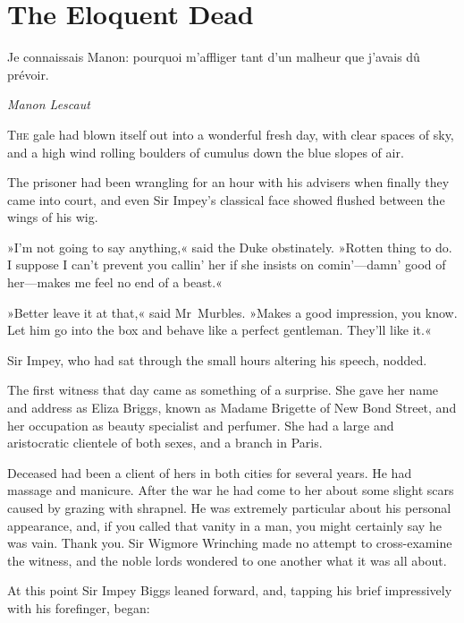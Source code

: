 

\chapter{The Eloquent Dead}

\epigraph{\begin{french}Je connaissais Manon: pourquoi m'affliger tant d'un malheur que j'avais dû prévoir.\end{french}}{\textit{Manon Lescaut}}




\lettrine[lines=4]{T}{he} gale had blown itself out into a wonderful fresh day, with clear
spaces of sky, and a high wind rolling boulders of cumulus down the
blue slopes of air.

\zz
The prisoner had been wrangling for an hour with his advisers when
finally they came into court, and even Sir Impey's classical face
showed flushed between the wings of his wig.

»I'm not going to say anything,« said the Duke obstinately. »Rotten
thing to do. I suppose I can't prevent you callin' her if she insists
on comin'—damn' good of her—makes me feel no end of a beast.«

»Better leave it at that,« said Mr~Murbles. »Makes a good impression,
you know. Let him go into the box and behave like a perfect gentleman.
They'll like it.«

Sir Impey, who had sat through the small hours altering his speech,
nodded.

The first witness that day came as something of a surprise. She gave
her name and address as Eliza Briggs, known as Madame Brigette of New
Bond Street, and her occupation as beauty specialist and perfumer. She
had a large and aristocratic clientele of both sexes, and a branch in
Paris.

Deceased had been a client of hers in both cities for several years.
He had massage and manicure. After the war he had come to her about
some slight scars caused by grazing with shrapnel. He was extremely
particular about his personal appearance, and, if you called that
vanity in a man, you might certainly say he was vain. Thank you. Sir
Wigmore Wrinching made no attempt to cross-examine the witness, and the
noble lords wondered to one another what it was all about.

At this point Sir Impey Biggs leaned forward, and, tapping his brief
impressively with his forefinger, began:

